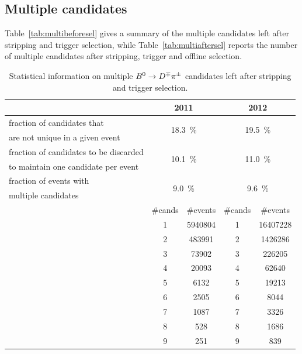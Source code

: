 \subsection{Multiple candidates}
\label{app:multiplecandidates}

Table~\ref{tab:multibeforesel} gives a summary of the multiple candidates left after stripping and trigger selection, while Table~\ref{tab:multiaftersel} 
reports the number of multiple candidates after stripping, trigger and offline selection.

\begin{table}[htbp]
  \centering
  \caption{Statistical information on multiple $B^0\rightarrow D^\mp\pi^\pm$ candidates left after stripping and trigger selection.}
    \begin{tabular}{lcccc}
    \toprule
      & \multicolumn{2}{c}{2011} & \multicolumn{2}{c}{2012}\\
    \midrule
     fraction of candidates that & \multicolumn{2}{c}{\multirow{2}[2]{*}{\SI{18.3}{\percent}}} & \multicolumn{2}{c}{\multirow{2}[2]{*}{\SI{19.5}{\percent}}}\\
     are not unique in a given event & & & & \\
    \midrule
    fraction of candidates to be discarded & \multicolumn{2}{c}{\multirow{2}[2]{*}{\SI{10.1}{\percent}}} & \multicolumn{2}{c}{\multirow{2}[2]{*}{\SI{11.0}{\percent}}}\\
       to maintain one candidate per event & & & & \\
    \midrule
    fraction of events with & \multicolumn{2}{c}{\multirow{2}[2]{*}{\SI{9.0}{\percent}}} & \multicolumn{2}{c}{\multirow{2}[2]{*}{\SI{9.6}{\percent}}}\\
    multiple  candidates & & & & \\
    \cmidrule(r){2-5}
      & \#cands & \#events & \#cands & \#events\\
      \cmidrule(r){2-5}
      & 1 & 5940804 & 1 & 16407228\\
      & 2 & 483991  & 2 & 1426286\\
      & 3 & 73902    & 3 & 226205\\
      & 4 & 20093     & 4 & 62640\\
      & 5 & 6132      & 5 & 19213\\
      & 6 & 2505      & 6 & 8044\\
      & 7 & 1087      & 7 & 3326\\
      & 8 & 528      & 8 & 1686\\
      & 9 & 251      & 9 & 839\\

\end{tabular}
\end{table}

